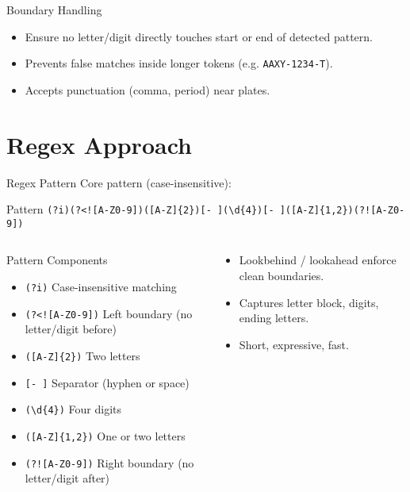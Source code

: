 \documentclass[aspectratio=169]{beamer}
\newcommand{\code}[1]{\texttt{#1}}
\begin{document}
\begin{frame}{Boundary Handling}
  \begin{itemize}
    \item Ensure no letter/digit directly touches start or end of detected pattern.
    \item Prevents false matches inside longer tokens (e.g. \code{AAXY-1234-T}).
    \item Accepts punctuation (comma, period) near plates.
  \end{itemize}
\end{frame}


\section{Regex Approach}

\begin{frame}[fragile]{Regex Pattern}
  Core pattern (case-insensitive):
  \begin{block}{Pattern}
  \small\verb|(?i)(?<![A-Z0-9])([A-Z]{2})[- ](\d{4})[- ]([A-Z]{1,2})(?![A-Z0-9])|
  \end{block}
  \begin{columns}[T,totalwidth=\textwidth]
      \begin{column}{0.65\textwidth}
        \begin{block}{Pattern Components}
          \small
          \begin{itemize}
            \item \texttt{(?i)} Case-insensitive matching
            \item \texttt{(?<![A-Z0-9])} Left boundary (no letter/digit before)
            \item \texttt{([A-Z]\{2\})} Two letters
            \item \texttt{[- ]} Separator (hyphen or space)
            \item \texttt{(\textbackslash d\{4\})} Four digits
            \item \texttt{([A-Z]\{1,2\})} One or two letters
            \item \texttt{(?![A-Z0-9])} Right boundary (no letter/digit after)
          \end{itemize}
        \end{block}
    \end{column}
    \begin{column}{0.35\textwidth}
      \begin{itemize}
        \vspace{2em}

        \item Lookbehind / lookahead enforce clean boundaries.
        \item Captures letter block, digits, ending letters.
        \item Short, expressive, fast.
      \end{itemize}
    \end{column}
  \end{columns}
\end{frame}
\end{document}
